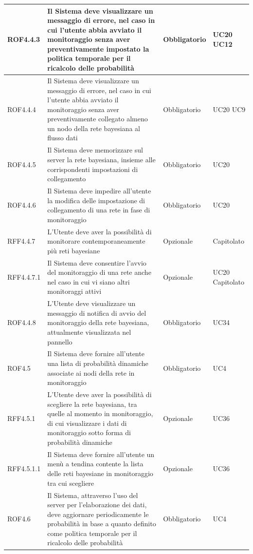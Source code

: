 \begin{center}
\begin{longtable}[c]{|m{}|m{}|m{}|m{}|}
\hline
\rowcolor{grigio}ROF4.4.3 & Il Sistema deve visualizzare un messaggio di errore, nel caso in cui l'utente abbia avviato il monitoraggio senza aver preventivamente impostato la politica temporale per il ricalcolo delle probabilità & Obbligatorio & UC20 UC12\\
\hline
ROF4.4.4 & Il Sistema deve visualizzare un messaggio di errore, nel caso in cui l'utente abbia avviato il monitoraggio senza aver preventivamente collegato almeno un nodo della rete bayesiana al flusso dati & Obbligatorio & UC20 UC9\\
\hline
\rowcolor{grigio}ROF4.4.5 & Il Sistema deve memorizzare sul server la rete bayesiana, insieme alle corrispondenti impostazioni di collegamento & Obbligatorio & UC20\\
\hline
ROF4.4.6 & Il Sistema deve impedire all'utente la modifica delle impostazione di collegamento di una rete in fase di monitoraggio & Obbligatorio & UC20\\
\hline
\rowcolor{grigio}RFF4.4.7 & L'Utente deve aver la possibilità di monitorare contemporaneamente più reti bayesiane & Opzionale & Capitolato\\
\hline
RFF4.4.7.1 & Il Sistema deve consentire l'avvio del monitoraggio di una rete anche nel caso in cui vi siano altri monitoraggi attivi & Opzionale & UC20 Capitolato\\
\hline
\rowcolor{grigio}ROF4.4.8 & L'Utente deve visualizzare un messaggio di notifica di avvio del monitoraggio della rete bayesiana, attualmente visualizzata nel pannello & Obbligatorio & UC34\\
\hline
ROF4.5 & Il Sistema deve fornire all'utente una lista di probabilità dinamiche associate ai nodi della rete in monitoraggio & Obbligatorio & UC4\\
\hline
\rowcolor{grigio}RFF4.5.1 & L'Utente deve aver la possibilità di scegliere la rete bayesiana, tra quelle al momento in monitoraggio, di cui visualizzare i dati di monitoraggio sotto forma di probabilità dinamiche & Opzionale & UC36\\
\hline
RFF4.5.1.1 & Il Sistema deve fornire all'utente un menù a tendina contente la lista delle reti bayesiane in monitoraggio tra cui scegliere & Opzionale & UC36\\
\hline
\rowcolor{grigio}ROF4.6 & Il Sistema, attraverso l'uso del server per l'elaborazione dei dati, deve aggiornare periodicamente le probabilità in base a quanto definito come politica temporale per il ricalcolo delle probabilità & Obbligatorio & UC4\\

\end{longtable}
\end{center}
